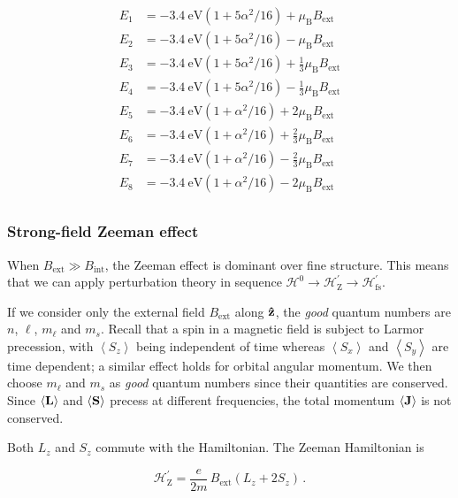 \documentclass[12pt, titlepage]{article}
\newcommand{\exv}[1]{\left\langle #1 \right\rangle}
\begin{document}
\begin{mdframed}[backgroundcolor=gray!20]
\begin{align*}
	E_1 &= -\SI{3.4}{\eV}(1 + 5\alpha^2/16) + \mu_\text{B} B_\text{ext} \\[4pt]
	E_2 &= -\SI{3.4}{\eV}(1 + 5\alpha^2/16) - \mu_\text{B} B_\text{ext} \\[4pt]
	E_3 &= -\SI{3.4}{\eV}(1 + 5\alpha^2/16) + \frac{1}{3}\mu_\text{B} B_\text{ext} \\[4pt]
	E_4 &= -\SI{3.4}{\eV}(1 + 5\alpha^2/16) - \frac{1}{3}\mu_\text{B} B_\text{ext} \\[4pt]
	E_5 &= -\SI{3.4}{\eV}(1 + \alpha^2/16) + 2\mu_\text{B} B_\text{ext} \\[4pt]
	E_6 &= -\SI{3.4}{\eV}(1 + \alpha^2/16) + \frac{2}{3}\mu_\text{B} B_\text{ext} \\[4pt]
	E_7 &= -\SI{3.4}{\eV}(1 + \alpha^2/16) - \frac{2}{3}\mu_\text{B} B_\text{ext} \\[4pt]
	E_8 &= -\SI{3.4}{\eV}(1 + \alpha^2/16) - 2\mu_\text{B} B_\text{ext} \\[4pt]
\end{align*}

\end{mdframed}

\subsubsection{Strong-field Zeeman effect}
When $B_\text{ext} \gg B_\text{int}$, the Zeeman effect is dominant over fine structure. This means that we can apply perturbation theory in sequence $\mathcal{H}^0 \rightarrow \mathcal{H}_\text{Z}^\prime \rightarrow \mathcal{H}_\text{fs}^\prime$. 

If we consider only the external field $B_\text{ext}$ along $\vu{z}$, the \textit{good} quantum numbers are $n$, $\ell$, $m_\ell$ and $m_s$. Recall that a spin in a magnetic field is subject to Larmor precession, with $\exv{S_z}$ being independent of time whereas $\exv{S_x}$ and $\exv{S_y}$ are time dependent; a similar effect holds for orbital angular momentum. We then choose $m_\ell$ and $m_s$ as \textit{good} quantum numbers since their quantities are conserved. Since $\exv{\vb{L}}$ and $\exv{\vb{S}}$ precess at different frequencies, the total momentum $\exv{\vb{J}}$ is not conserved.

Both $L_z$ and $S_z$ commute with the Hamiltonian. The Zeeman Hamiltonian is

\begin{equation*}
	\mathcal{H}_\text{Z}^\prime = \frac{e}{2m}\,B_\text{ext}(L_z + 2S_z) \,.
\end{equation*}
\end{document}
